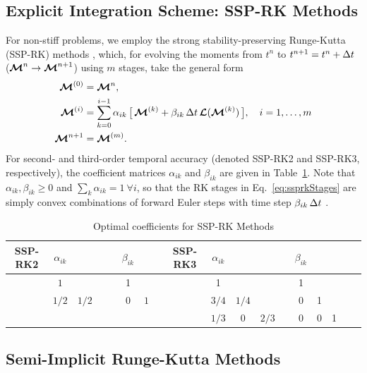 \documentclass[10pt,preprint]{aastex}
\begin{document}
\subsection{Explicit Integration Scheme: SSP-RK Methods}
\label{sec:explicitTime}

For non-stiff problems, we employ the strong stability-preserving Runge-Kutta (SSP-RK) methods \citep[e.g.,][]{gottlieb_etal_2001}, which, for evolving the moments from $t^{n}$ to $t^{n+1}=t^{n}+\Delta t$ ($\boldsymbol{\mathcal{M}}^{n}\to\boldsymbol{\mathcal{M}}^{n+1}$) using $m$ stages, take the general form
\begin{align}
  \boldsymbol{\mathcal{M}}^{(0)}
  &=\boldsymbol{\mathcal{M}}^{n}, \\
  \boldsymbol{\mathcal{M}}^{(i)}
  &=\sum_{k=0}^{i-1}\alpha_{ik}\,\big[\,\boldsymbol{\mathcal{M}}^{(k)}+\beta_{ik}\,\Delta t\,\boldsymbol{\mathcal{L}}(\boldsymbol{\mathcal{M}}^{(k)})\,\big], \quad i=1,\ldots,m 
  \label{eq:ssprkStages} \\
  \boldsymbol{\mathcal{M}}^{n+1}
  &=\boldsymbol{\mathcal{M}}^{(m)}.  
\end{align}
For second- and third-order temporal accuracy (denoted SSP-RK2 and SSP-RK3, respectively), the coefficient matrices $\alpha_{ik}$ and $\beta_{ik}$ are given in Table~\ref{tab:ssprkCoefficients}.  
Note that $\alpha_{ik},\beta_{ik}\ge0$ and $\sum_{k}\alpha_{ik}=1~\forall i$, so that the RK stages in Eq.~\eqref{eq:ssprkStages} are simply convex combinations of forward Euler steps with time step $\beta_{ik}\,\Delta t$ \citep{shuOsher_1988}.  

\begin{table}
  \begin{center}
  \caption{Optimal coefficients for SSP-RK Methods \citep{shuOsher_1988} \label{tab:ssprkCoefficients}}
  \begin{tabular}{cccccccccccccccccc}
    \midrule
     SSP-RK2 & $\alpha_{ik}$ & & & & $\beta_{ik}$ & & & SSP-RK3 & $\alpha_{ik}$ & & & & $\beta_{ik}$ \\
    \midrule
    \midrule
      & $1$ & & & & 1 & & & & 1 & & & & 1 \\  
      & $1/2$ & $1/2$ & & & $0$ & $1$ & & & $3/4$ & $1/4$ & & & 0 & 1  \\
      & & & & & & & & & $1/3$ & 0 & $2/3$ & & 0 & 0 & 1 \\ 
    \midrule
    \midrule
  \end{tabular}
  \end{center}
\end{table}

\subsection{Semi-Implicit Runge-Kutta Methods}
\label{sec:semiImplicitTime}
\end{document}
